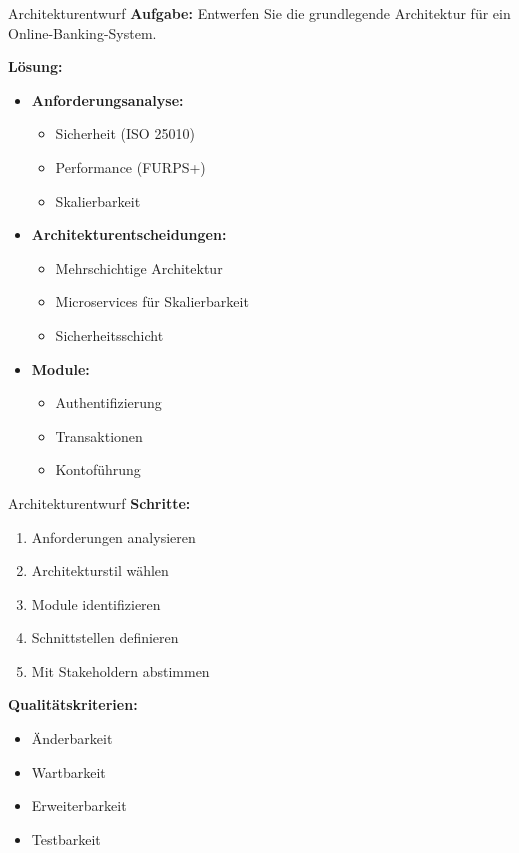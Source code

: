 \begin{example}{Architekturentwurf}
\textbf{Aufgabe:} Entwerfen Sie die grundlegende Architektur für ein Online-Banking-System.

\textbf{Lösung:}
\begin{itemize}
    \item \textbf{Anforderungsanalyse:}
    \begin{itemize}
        \item Sicherheit (ISO 25010)
        \item Performance (FURPS+)
        \item Skalierbarkeit
    \end{itemize}
    
    \item \textbf{Architekturentscheidungen:}
    \begin{itemize}
        \item Mehrschichtige Architektur
        \item Microservices für Skalierbarkeit
        \item Sicherheitsschicht
    \end{itemize}
    
    \item \textbf{Module:}
    \begin{itemize}
        \item Authentifizierung
        \item Transaktionen
        \item Kontoführung
    \end{itemize}
\end{itemize}
\end{example}

\begin{KR}{Architekturentwurf}
\textbf{Schritte:}
\begin{enumerate}
    \item Anforderungen analysieren
    \item Architekturstil wählen
    \item Module identifizieren
    \item Schnittstellen definieren
    \item Mit Stakeholdern abstimmen
\end{enumerate}

\textbf{Qualitätskriterien:}
\begin{itemize}
    \item Änderbarkeit
    \item Wartbarkeit
    \item Erweiterbarkeit
    \item Testbarkeit
\end{itemize}
\end{KR}